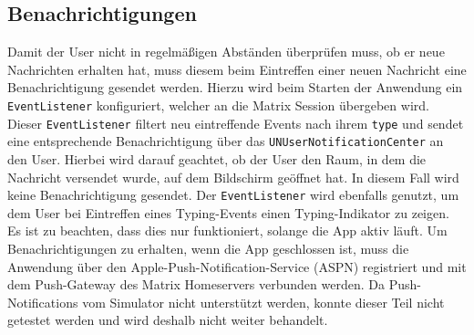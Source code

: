     \subsection{Benachrichtigungen}\label{subsec:benachrichtigungen}
    Damit der User nicht in regelmäßigen Abständen überprüfen muss, ob er neue Nachrichten erhalten hat, muss diesem beim Eintreffen einer neuen Nachricht eine Benachrichtigung gesendet werden.
    Hierzu wird beim Starten der Anwendung ein \texttt{EventListener} konfiguriert, welcher an die Matrix Session übergeben wird.
    Dieser \texttt{EventListener} filtert neu eintreffende Events nach ihrem \texttt{type} und sendet eine entsprechende Benachrichtigung über das \texttt{UNUserNotificationCenter} an den User.
    Hierbei wird darauf geachtet, ob der User den Raum, in dem die Nachricht versendet wurde, auf dem Bildschirm geöffnet hat.
    In diesem Fall wird keine Benachrichtigung gesendet.
    Der \texttt{EventListener} wird ebenfalls genutzt, um dem User bei Eintreffen eines Typing-Events einen Typing-Indikator zu zeigen.\\
    Es ist zu beachten, dass dies nur funktioniert, solange die App aktiv läuft.
    Um Benachrichtigungen zu erhalten, wenn die App geschlossen ist, muss die Anwendung über den Apple-Push-Notification-Service (ASPN) registriert und mit dem Push-Gateway des Matrix Homeservers verbunden werden.
    Da Push-Notifications vom Simulator nicht unterstützt werden, konnte dieser Teil nicht getestet werden und wird deshalb nicht weiter behandelt.

    \newpage
